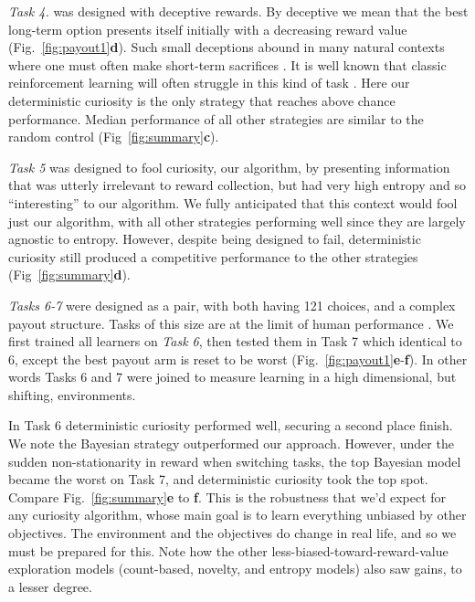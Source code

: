 \textit{Task 4.} was designed with deceptive rewards. By deceptive we mean that the best long-term option presents itself initially with a decreasing reward value (Fig.~\ref{fig:payout1}\textbf{d}). Such small deceptions abound in many natural contexts where one must often make short-term sacrifices \citep{internicola2012bumble}. It is well known that classic reinforcement learning will often struggle in this kind of task \citep{Lehman2011a,Sutton2018}. Here our deterministic curiosity is the only strategy that reaches above chance performance. Median performance of all other strategies are similar to the random control (Fig~\ref{fig:summary}\textbf{c}). 

\textit{Task 5} was designed to fool curiosity, our algorithm, by presenting information that was utterly irrelevant to reward collection, but had very high entropy and so ``interesting'' to our algorithm. We fully anticipated that this context would fool just our algorithm, with all other strategies performing well since they are largely agnostic to entropy. However, despite being designed to fail, deterministic curiosity still produced a competitive performance to the other strategies (Fig~\ref{fig:summary}\textbf{d}). 

\textit{Tasks 6-7} were designed as a pair, with both having 121 choices, and a complex payout structure. Tasks of this size are at the limit of human performance \citep{Wu2018}. We first trained all learners on \textit{Task 6}, then tested them in Task 7 which identical to 6, except the best payout arm is reset to be worst (Fig.~\ref{fig:payout1}\textbf{e}-\textbf{f}). In other words Tasks 6 and 7 were joined to measure learning in a high dimensional, but shifting, environments.

In Task 6 deterministic curiosity performed well, securing a second place finish. We note the Bayesian strategy  outperformed our approach. However, under the sudden non-stationarity in reward when switching tasks, the top Bayesian model became the worst on Task 7, and deterministic curiosity took the top spot. Compare Fig.~\ref{fig:summary}\textbf{e} to \textbf{f}. This is the robustness that we'd expect for any curiosity algorithm, whose main goal is to learn everything unbiased by other objectives. The environment and the objectives do change in real life, and so we must be prepared for this. Note how the other less-biased-toward-reward-value exploration models (count-based, novelty, and entropy models) also saw gains, to a lesser degree.

